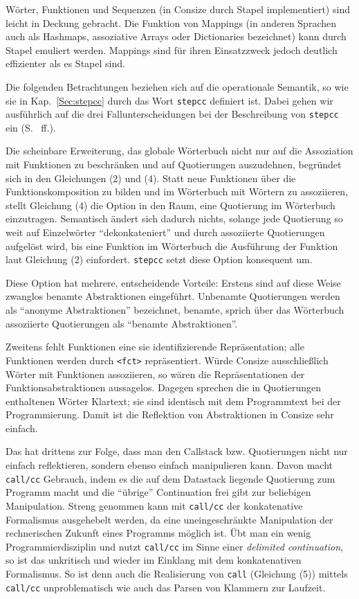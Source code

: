 Wörter, Funktionen und Sequenzen (in Consize durch Stapel implementiert) sind leicht in Deckung gebracht. Die Funktion von Mappings (in anderen Sprachen auch als Hashmaps, assoziative Arrays oder Dictionaries bezeichnet) kann durch Stapel emuliert werden. Mappings sind für ihren Einsatzzweck jedoch deutlich effizienter als es Stapel sind.

Die folgenden Betrachtungen beziehen sich auf die operationale Semantik, so wie sie in Kap.~\ref{Sec:stepcc} durch das Wort \verb|stepcc| definiert ist. Dabei gehen wir ausführlich auf die drei Fallunterscheidungen bei der Beschreibung von \verb|stepcc| ein (S.~\pageref{description.stepcc} ff.).

\smallskip{}
Die scheinbare Erweiterung, das globale Wörterbuch nicht nur auf die Assoziation mit Funktionen zu beschränken und auf Quotierungen auszudehnen, begründet sich in den Gleichungen (2) und (4). Statt neue Funktionen über die Funktionskomposition zu bilden und im Wörterbuch mit Wörtern zu assoziieren, stellt Gleichung (4) die Option in den Raum, eine Quotierung im Wörterbuch einzutragen. Semantisch ändert sich dadurch nichts, solange jede Quotierung so weit auf Einzelwörter "`dekonkateniert"' und durch assoziierte Quotierungen aufgelöst wird, bis eine Funktion im Wörterbuch die Ausführung der Funktion laut Gleichung (2) einfordert. \verb|stepcc| setzt diese Option konsequent um.

Diese Option hat mehrere, entscheidende Vorteile: Erstens sind auf diese Weise zwanglos benamte Abstraktionen eingeführt. Unbenamte Quotierungen werden als "`anonyme Abstraktionen"' bezeichnet, benamte, sprich über das Wörterbuch assoziierte Quotierungen als "`benamte Abstraktionen"'.

Zweitens fehlt Funktionen eine sie identifizierende Repräsentation; alle Funktionen werden durch \verb|<fct>| repräsentiert. Würde Consize ausschließlich Wörter mit Funktionen assoziieren, so wären die Repräsentationen der Funktionsabstraktionen aussagelos. Dagegen sprechen die in Quotierungen enthaltenen Wörter Klartext; sie sind identisch mit dem Programmtext bei der Programmierung. Damit ist die Reflektion von Abstraktionen in Consize sehr einfach.

Das hat drittens zur Folge, dass man den Callstack bzw. Quotierungen nicht nur einfach reflektieren, sondern ebenso einfach manipulieren kann. Davon macht \verb|call/cc| Gebrauch, indem es die auf dem Datastack liegende Quotierung zum Programm macht und die "`übrige"' Continuation frei gibt zur beliebigen Manipulation. Streng genommen kann mit \verb|call/cc| der konkatenative Formalismus ausgehebelt werden, da eine uneingeschränkte Manipulation der rechnerischen Zukunft eines Programms möglich ist. Übt man ein wenig Programmierdisziplin und nutzt \verb|call/cc| im Sinne einer \emph{delimited continuation}, so ist das unkritisch und wieder im Einklang mit dem konkatenativen Formalismus. So ist denn auch die Realisierung von \verb|call| (Gleichung (5)) mittels \verb|call/cc| unproblematisch wie auch das Parsen von Klammern zur Laufzeit.

